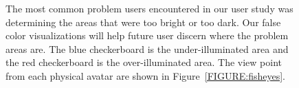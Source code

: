\documentclass[10pt,twocolumn,letterpaper]{article}
\begin{document}
\begin{figure}[t]
\begin{center}
\end{center}
\vspace{-0.1in}
\caption{The most common problem users encountered in our user study
  was determining the areas that were too bright or too dark.  Our
  false color visualizations will help future user discern where the
  problem areas are.  The blue checkerboard is the under-illuminated
  area and the red checkerboard is the over-illuminated area.  The
  view point from each physical avatar are shown in
  Figure~\ref{FIGURE:fisheyes}.}
\label{FIGURE:office_false_color}
\end{figure}



\begin{figure}[t]
\newcommand{\picwidth}{.95in}

\end{figure}
\end{document}
